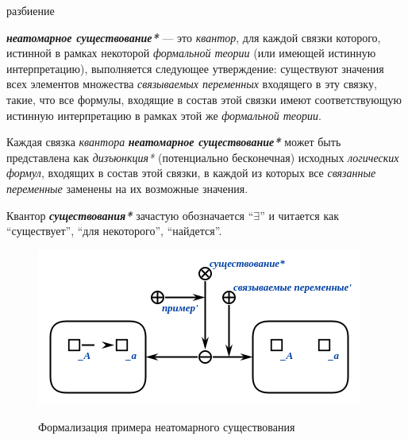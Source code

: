 \begin{SCn}
\begin{scnrelfromset}{разбиение}
\end{scnrelfromset}

\end{SCn}

\textbf{\textit{неатомарное существование*}} --- это \textit{квантор}, для каждой связки которого, истинной в рамках некоторой \textit{формальной теории} (или имеющей истинную интерпретацию), выполняется следующее утверждение: существуют значения всех элементов множества \textit{связываемых переменных\scnrolesign} входящего в эту связку, такие, что все формулы, входящие в состав этой связки имеют соответствующую истинную интерпретацию в рамках этой же \textit{формальной теории}.

Каждая связка \textit{квантора} \textbf{\textit{неатомарное существование*}} может быть представлена как \textit{дизъюнкция*} (потенциально бесконечная) исходных \textit{логических формул}, входящих в состав этой связки, в каждой из которых все \textit{связанные переменные\scnrolesign} заменены на их возможные значения.

Квантор \textbf{\textit{существования*}} зачастую обозначается ``$\exists$'' и читается как ``существует'', ``для некоторого'', ``найдется''.

\begin{figure}[H]
\caption{Формализация примера неатомарного существования}
\includegraphics[scale=0.8]{author/part2/figures/logic/non_atomicExistence.png}
\label{fig:non_atomic_existence}
\end{figure}

\begin{SCn}
\end{SCn}

